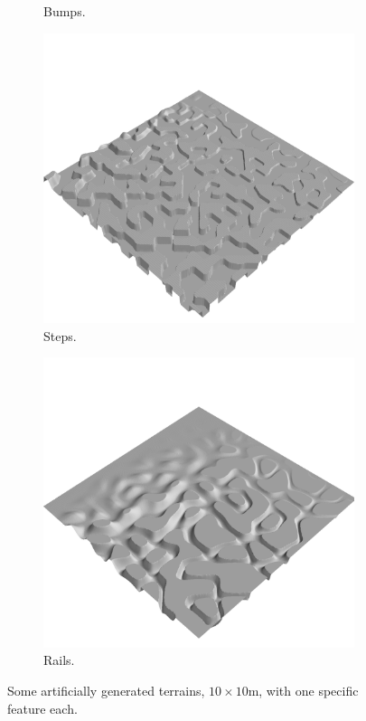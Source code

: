 \documentclass[../document.tex]{subfiles}
\begin{document}
\begin{figure}[H]
\begin{subfigure}[b]{0.24\textwidth}
        \caption{Bumps.}
 \end{subfigure}  
    \begin{subfigure}[b]{0.24\textwidth}
        \includegraphics[width=\linewidth]{../img/hm3d/steps1.png}
        \caption{Steps.}
 \end{subfigure}  
    \begin{subfigure}[b]{0.24\textwidth}
        \includegraphics[width=\linewidth]{../img/hm3d/rails3.png}
        \caption{Rails.}
    \end{subfigure}  
\caption{Some artificially generated terrains, $10\times 10$m, with one specific feature each. }   
\end{figure}
\end{document}
